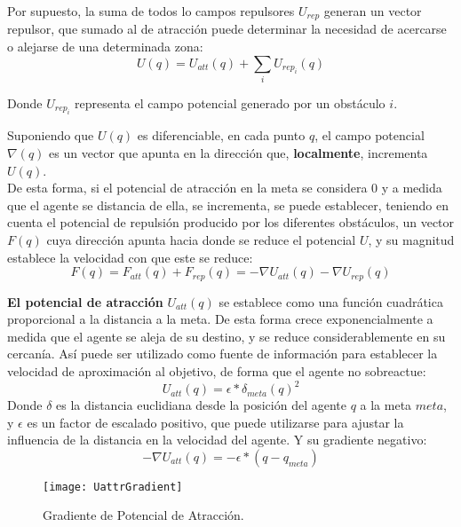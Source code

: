 Por supuesto, la suma de todos lo campos repulsores $U_{rep}$ generan un vector repulsor, que sumado al de atracción puede determinar la necesidad de acercarse o alejarse de una determinada zona:
\begin{equation}
U(q) = U_{att}(q) + \sum_i{U_{rep_i}(q)}
\label{equation:UqTotal}
\end{equation}

Donde $U_{rep_i}$ representa el campo potencial generado por un obstáculo $i$.

Suponiendo que $U(q)$ es diferenciable, en cada punto $q$, el campo potencial $\nabla(q)$ es un vector que apunta en la dirección que, \textbf{localmente}, incrementa $U(q)$. \\De esta forma, si el potencial de atracción en la meta se considera 0 y a medida que el agente se distancia de ella, se incrementa, se puede establecer, teniendo en cuenta el potencial de repulsión producido por los diferentes obstáculos, un vector $F(q)$ cuya dirección apunta hacia donde se reduce el potencial $U$, y su magnitud establece la velocidad con que este se reduce:
\begin{equation}
F(q) = F_{att}(q) + F_{rep}(q) = -\nabla U_{att}(q) - \nabla U_{rep}(q)
\label{equation:Fq}
\end{equation}


\textbf{El potencial de atracción} $U_{att}(q)$ se establece como una función cuadrática proporcional a la distancia a la meta. De esta forma crece exponencialmente a medida que el agente se aleja de su destino, y se reduce considerablemente en su cercanía. Así puede ser utilizado como fuente de información para establecer la velocidad de aproximación al objetivo, de forma que el agente no sobreactue:
\begin{equation}
U_{att}(q) = \epsilon * \delta_{meta}(q)^2
\label{equation:Uatt}
\end{equation}
Donde $\delta$ es la distancia euclidiana desde la posición del agente $q$ a la meta $meta$, y $\epsilon$ es un factor de escalado positivo, que puede utilizarse para ajustar la influencia de la distancia en la velocidad del agente. Y su gradiente negativo: 
\begin{equation}
-\nabla U_{att}(q) = -\epsilon * (q - q_{meta})
\label{equation:dUatt}
\end{equation}
\begin{figure}[H]
	\centering
	\texttt{[image: UattrGradient]}
	\caption{Gradiente de Potencial de Atracción.}\label{fig:uattrgrad}
\end{figure}

